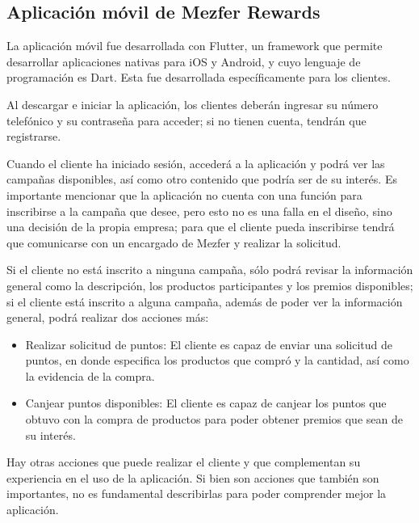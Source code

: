 \subsection{Aplicación móvil de Mezfer Rewards}
La aplicación móvil fue desarrollada con Flutter, un framework que permite desarrollar aplicaciones nativas para iOS y Android, y cuyo lenguaje de programación es Dart. Esta fue desarrollada específicamente para los clientes.

Al descargar e iniciar la aplicación, los clientes deberán ingresar su número telefónico y su contraseña para acceder; si no tienen cuenta, tendrán que registrarse.

Cuando el cliente ha iniciado sesión, accederá a la aplicación y podrá ver las campañas disponibles, así como otro contenido que podría ser de su interés. Es importante mencionar que la aplicación no cuenta con una función para inscribirse a la campaña que desee, pero esto no es una falla en el diseño, sino una decisión de la propia empresa; para que el cliente pueda inscribirse tendrá que comunicarse con un encargado de Mezfer y realizar la solicitud.

Si el cliente no está inscrito a ninguna campaña, sólo podrá revisar la información general como la descripción, los productos participantes y los premios disponibles; si el cliente está inscrito a alguna campaña, además de poder ver la información general, podrá realizar dos acciones más:
\begin{itemize}
    \item Realizar solicitud de puntos: El cliente es capaz de enviar una solicitud de puntos, en donde especifica los productos que compró y la cantidad, así como la evidencia de la compra.
    \item Canjear puntos disponibles: El cliente es capaz de canjear los puntos que obtuvo con la compra de productos para poder obtener premios que sean de su interés.
\end{itemize}
Hay otras acciones que puede realizar el cliente y que complementan su experiencia en el uso de la aplicación. Si bien son acciones que también son importantes, no es fundamental describirlas para poder comprender mejor la aplicación.